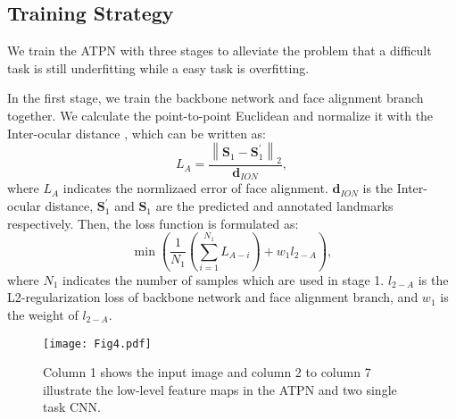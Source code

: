 \documentclass[3p,twocolumn, round, sort & compress]{elsarticle}
\begin{document}
\subsection{Training Strategy}
We train the ATPN with three stages to alleviate the problem that a difficult task is still underfitting while a easy task is overfitting. 



In the first stage, we train the backbone network and face alignment branch together. We calculate the point-to-point Euclidean and normalize it with the Inter-ocular distance \citep{300W}, which can be written as:
\begin{equation}
{L_A} = \frac{\left\|\bm{S}_1-\bm{{S}}_1^\prime\right\|_2}{\bm{d}_{ION}},
\end{equation}
where $L_A$ indicates the normlizaed error of face alignment. $\bm{d}_{ION}$ is the Inter-ocular distance, $\bm{{S}}_1^\prime$ and $\bm{{S}}_1$ are the predicted and annotated landmarks respectively. Then, the loss function is formulated as:
\begin{equation}
\min \left( {\frac{1}{{{N_1}}}\left( {\sum\limits_{i = 1}^{{N_1}} {{L_{A - i}}} } \right) + {w_1}{l_{2 - A}}} \right),
\end{equation}
where $N_1$ indicates the number of samples which are used in stage 1. $l_{2-A}$ is the L2-regularization loss of backbone network and face alignment branch, and $w_1$ is the weight of $l_{2-A}$.

\begin{figure}[t!]
	\centering
	\texttt{[image: Fig4.pdf]}
	\caption{Column 1 shows the input image and column 2 to column 7 illustrate the low-level feature maps in the ATPN and two single task CNN.}
	\label{fig4}
\end{figure}
\end{document}
